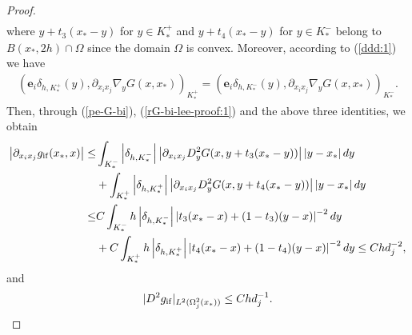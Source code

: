 \documentclass[1996/10/24]{amsart}
\theoremstyle{definition}
\numberwithin{equation}{section}
\begin{document}
\begin{proof}
\begin{align*}
\end{align*}
where $y+t_3(x_{\ast}-y)$ for $y\in K_{\ast}^+$ and $y+t_4(x_{\ast}-y)$ for $y\in K_{\ast}^-$ belong to $B(x_{\ast},2h)\cap\Omega$ since the domain $\Omega$ is convex. Moreover, according to (\ref{ddd:1}) we have
\begin{align*}
({\bm e}_i\delta_{h,K_{\ast}^+}(y),\partial_{x_ix_j}\nabla_y G(x,x_{\ast}))_{K_{\ast}^+}=({\bm e}_i\delta_{h,K_{\ast}^-}(y),\partial_{x_ix_j}\nabla_y G(x,x_{\ast}))_{K_{\ast}^-}.
\end{align*}
 Then, through (\ref{pe-G-bi}), (\ref{rG-bi-lee-proof:1}) and the above three identities, we obtain
\begin{align*}
\left|\partial_{x_ix_j} g_{{\rm if}}(x_{\ast},x)\right|\leq&\int_{K^-_{\ast}}\left|\delta_{h,K^-_{\ast}}\right|\left|\partial_{x_ix_j}D^2_y G(x,y+t_3(x_{\ast}-y))\right|\left|y-x_{\ast}\right| dy\\
&+\int_{K^+_{\ast}}\left|\delta_{h,K^+_{\ast}}\right|\left|\partial_{x_ix_j}D^2_y G(x,y+t_4(x_{\ast}-y))\right|\left|y-x_{\ast}\right| dy\\
\leq&C\int_{K^-_{\ast}}h\left|\delta_{h,K^-_{\ast}}\right|\left|t_3(x_{\ast}-x)+(1-t_3)(y-x)\right|^{-2} dy\\
&+C\int_{K^+_{\ast}}h\left|\delta_{h,K^+_{\ast}}\right|\left|t_4(x_{\ast}-x)+(1-t_4)(y-x)\right|^{-2} dy\leq Chd_j^{-2},
\end{align*}
and
\begin{align*}
|D^2 g_{{\rm if}}|_{L^2(\Omega_j^2(x_{\ast}))}\leq Chd_j^{-1}.
\end{align*}


\end{proof}
\end{document}
